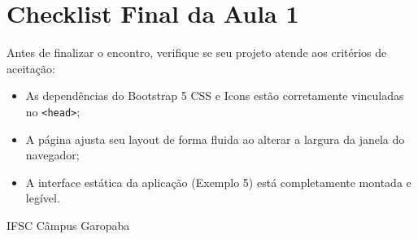 
\section{Checklist Final da Aula 1}\label{sec:m4b}

\begin{checklist}

Antes de finalizar o encontro, verifique se seu projeto atende aos critérios de aceitação:

\begin{itemize}
\item[\caixaMarcar] As dependências do Bootstrap 5 CSS e Icons estão corretamente vinculadas no \texttt{<head>};
\item[\caixaMarcar] A página ajusta seu layout de forma fluida ao alterar a largura da janela do navegador;
\item[\caixaMarcar] A interface estática da aplicação (Exemplo 5) está completamente montada e legível.
\end{itemize}
\end{checklist}

\vfill
{\centering\footnotesize\color{suave}\faMapMarkerAlt\hspace{0.4em}IFSC Câmpus Garopaba\par}
